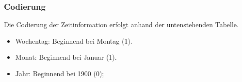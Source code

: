 \begin{figure}
\end{figure}

\subsubsection{Codierung}
Die Codierung der Zeitinformation erfolgt anhand der untenstehenden Tabelle.

\begin{itemize}
\item Wochentag: Beginnend bei Montag (1).
\item Monat: Beginnend bei Januar (1).
\item Jahr: Beginnend bei 1900 (0); %
\end{itemize}


